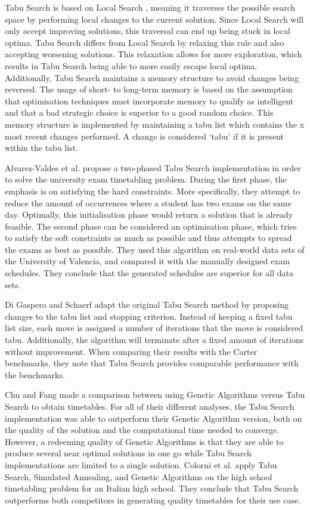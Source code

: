 Tabu Search \cite{glover1993} is based on Local Search \cite{lin1973}, meaning it traverses the possible search space by performing local changes to the current solution. Since Local Search will only accept improving solutions, this traversal can end up being stuck in local optima. Tabu Search differs from Local Search by relaxing this rule and also accepting worsening solutions. This relaxation allows for more exploration, which results in Tabu Search being able to more easily escape local optima. Additionally, Tabu Search maintains a memory structure to avoid changes being reversed. The usage of short- to long-term memory is based on the assumption that optimisation techniques must incorporate memory to qualify as intelligent and that a bad strategic choice is superior to a good random choice\cite{glover1999}. This memory structure is implemented by maintaining a tabu list which contains the x most recent changes performed. A change is considered ‘tabu’ if it is present within the tabu list.

Alvarez-Valdes et al. \cite{alvarez1997} propose a two-phased Tabu Search implementation in order to solve the university exam timetabling problem. During the first phase, the emphasis is on satisfying the hard constraints. More specifically, they attempt to reduce the amount of occurrences where a student has two exams on the same day. Optimally, this initialisation phase would return a solution that is already feasible. The second phase can be considered an optimisation phase, which tries to satisfy the soft constraints as much as possible and thus attempts to spread the exams as best as possible. They used this algorithm on real-world data sets of the University of Valencia, and compared it with the manually designed exam schedules. They conclude that the generated schedules are superior for all data sets.

Di Gaspero and Schaerf \cite{gaspero2001} adapt the original Tabu Search method by proposing changes to the tabu list and stopping criterion. Instead of keeping a fixed tabu list size, each move is assigned a number of iterations that the move is considered tabu. Additionally, the algorithm will terminate after a fixed amount of iterations without improvement. When comparing their results with the Carter benchmarks, they note that Tabu Search provides comparable performance with the benchmarks.

Chu and Fang \cite{Chu2000} made a comparison between using Genetic Algorithms versus Tabu Search to obtain timetables. For all of their different analyses, the Tabu Search implementation was able to outperform their Genetic Algorithm version, both on the quality of the solution and the computational time needed to converge. However, a redeeming quality of Genetic Algorithms is that they are able to produce several near optimal solutions in one go while Tabu Search implementations are limited to a single solution. 
Colorni et al. \cite{colorni1999} apply Tabu Search, Simulated Annealing, and Genetic Algorithms on the high school timetabling problem for an Italian high school. They conclude that Tabu Search outperforms both competitors in generating quality timetables for their use case.


